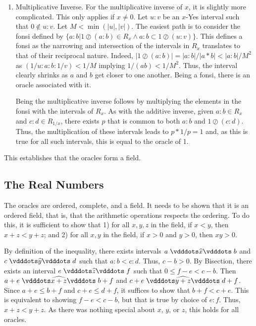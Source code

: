 \documentclass[12pt]{article}
\begin{document}
\begin{enumerate}
    \item Multiplicative Inverse. For the multiplicative inverse of $x$, it is slightly more complicated. This only applies if $x \neq 0$. Let $u:v$ be an $x$-Yes interval such that $0 \notin u:v$. Let $M < \min(|u|, |v|)$. 
    The easiest path is to consider the fonsi defined by $\{ a:b | 1 \oslash (a:b) \in R_x \wedge a:b \subset 1 \oslash (u:v) \}$. This defines a fonsi as the narrowing and intersection of the intervals in $R_x$ translates to that of their reciprocal nature. Indeed, $|1 \oslash (a:b)| = |a:b|/|a*b| < |a:b|/M^2$ as $(1/u : a : b: 1/v) < 1/M$ implying $1/(ab)< 1/M^2$. Thus, the interval clearly shrinks as $a$ and $b$ get closer to one another. Being a fonsi, there is an oracle associated with it. 

    Being the multiplicative inverse follows by multiplying the elements in the fonsi with the intervals of $R_x$. As with the additive inverse, given $a:b \in R_x$ and $c:d \in R_{1/x}$, there exists $p$ that is common to both $a:b$ and $1 \oslash (c:d)$. Thus, the multiplication of these intervals leads to $p *1/p = 1$ and, as this is true for all such intervals, this is equal to the oracle of 1. 

\end{enumerate}

This establishes that the oracles form a field. 


\subsection{The Real Numbers}

The oracles are ordered, complete, and a field. It needs to be shown that it is an ordered field, that is, that the arithmetic operations respects the ordering. To do this, it is sufficient to show that 1) for all $x, y, z$ in the field, if $x<y$, then $x + z < y +z$; and 2) for all $x, y$ in the field, if $x >0$ and $y>0$, then $xy > 0 $.

By definition of the inequality, there exists intervals $ a \xora[x] b$ and $c \xora[y] d$ such that $a:b < c:d$. Thus, $c-b > 0$. By Bisection, there exists an interval $e \xora[z] f$ such that $0 \leq f-e < c-b$. Then $a+e \xora[x+z] b+f$ and $c+e \xora[y+z] d+f$. Since $a+e \leq  b+f$ and $c+e \leq d+f$, it suffices to show that $b+f < c+e$. This is equivalent to showing $f-e < c-b$, but that is true by choice of $e:f$. Thus, $x+z < y+z$. As there was nothing special about $x$, $y$, or $z$, this holds for all oracles. 
\end{document}
